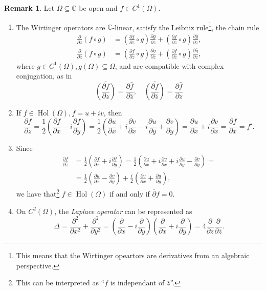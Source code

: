 \documentclass[letterpaper, 11pt]{article}
\newcommand{\C}{\mathbb{C}}
\newcommand{\1}{\mathds{1}}
\newcommand{\Wirtz}[1][]{\frac{\partial #1}{\partial z}}
\newcommand{\Wirtzbar}[1][]{\frac{\partial #1}{\partial \bar{z}}}
\newcommand{\wirtzbar}{\overline{\partial}}
\DeclareMathOperator*{\Hol}{Hol}
\theoremstyle{definition}
\newtheorem{remark}[theorem]{Remark}
\begin{document}
\begin{remark}
  Let $\Omega \subseteq \C$ be open and $f \in C^1(\Omega)$.
  \begin{enumerate}
    \item The Wirtinger operators are $\C$-linear, satisfy the Leibniz rule\footnote{This means that the Wirtinger opeartors are derivatives from an algebraic perspective.}, the chain rule
    \begin{align*}
      \Wirtz (f \circ g) &= \left( \Wirtz[f] \circ g \right) \Wirtz[g] + \left( \Wirtzbar[f] \circ g \right) \Wirtz[\bar{g}], \\
      \Wirtzbar (f \circ g) &= \left( \Wirtz[f] \circ g \right) \Wirtzbar[g] + \left( \Wirtzbar[f] \circ g \right) \Wirtzbar[\bar{g}],
    \end{align*}
    where $g \in C^1(\Omega), g(\Omega) \subseteq \Omega$, and are compatible with complex conjugation, as in
    $$ \overline{\left( \frac{\partial f}{\partial z} \right)} = \frac{\partial \bar{f}}{\partial \bar{z}}, \quad \overline{\left( \frac{\partial f}{\partial \bar{z}} \right)} = \frac{\partial \bar{f}}{\partial z} $$
    \item If $f \in \Hol(\Omega), f = u + iv$, then
    $$
      \frac{\partial f}{\partial z} = \frac{1}{2} \left( \frac{\partial f}{\partial x} - i \frac{\partial f}{\partial y} \right) = \frac{1}{2} \left( \frac{\partial u}{\partial x} + i\frac{\partial v}{\partial x} - i\frac{\partial u}{\partial y} + \frac{\partial v}{\partial y} \right) = \frac{\partial u}{\partial x} + i \frac{\partial v}{\partial x} = \frac{\partial f}{\partial x} = f'.
    $$
    \item Since
    \begin{align*}      
      \frac{\partial f}{\partial \bar{z}} &= \frac{1}{2} \left( \frac{\partial f}{\partial x} + i \frac{\partial f}{\partial y} \right) = \frac{1}{2} \left( \frac{\partial u}{\partial x} + i\frac{\partial v}{\partial x} + i\frac{\partial u}{\partial y} - \frac{\partial v}{\partial y} \right) = \\
      &= \frac{1}{2} \left( \frac{\partial u}{\partial x} - \frac{\partial v}{\partial y} \right) + \frac{i}{2} \left( \frac{\partial v}{\partial x} + \frac{\partial u}{\partial y} \right),
    \end{align*}
    we have that\footnote{This can be interpreted as ``$f$ is independant of $\overline{z}$''.} $f \in \Hol(\Omega)$ if and only if $\wirtzbar f = 0$.
    \item On $C^2(\Omega)$, the \emph{Laplace operator} can be represented as
    $$ \Delta = \frac{\partial^2}{\partial x^2} + \frac{\partial^2}{\partial y^2} = \left( \frac{\partial}{\partial x} - i \frac{\partial}{\partial y} \right) \left( \frac{\partial}{\partial x} + i \frac{\partial}{\partial y} \right) = 4 \frac{\partial}{\partial z} \frac{\partial}{\partial \bar{z}}. $$
  \end{enumerate}
\end{remark}
\end{document}
